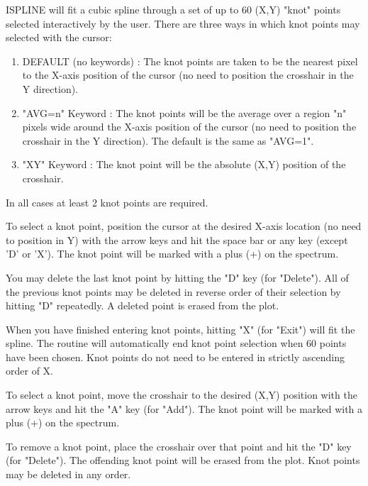 ISPLINE will fit a cubic spline through a set of up to 60 (X,Y) "knot"
points selected interactively by the user.  There are three ways in which
knot points may selected with the cursor:
\begin{enumerate} 
  \item{DEFAULT (no keywords) : The knot points are taken to be the nearest
       pixel to the X-axis position of the cursor (no need to position the
       crosshair in the Y direction).}

  \item{"AVG=n" Keyword : The knot points will be the average over a region
       "n" pixels wide around the X-axis position of the cursor (no need to
       position the crosshair in the Y direction).  The default is the same
       as "AVG=1".}

  \item{"XY" Keyword : The knot point will be the absolute (X,Y) position
       of the crosshair.}
\end{enumerate}
In all cases at least 2 knot points are required.

 
To select a knot point, position the cursor at the desired X-axis location
(no need to position in Y) with the arrow keys and hit the space bar or any
key (except 'D' or 'X').  The knot point will be marked with a plus (+) on
the spectrum.
 
You may delete the last knot point by hitting the "D" key (for "Delete").
All of the previous knot points may be deleted in reverse order of their
selection by hitting "D" repeatedly.  A deleted point is erased from the
plot.
 
When you have finished entering knot points, hitting "X" (for "Exit") will
fit the spline. The routine will automatically end knot point selection
when 60 points have been chosen.  Knot points do not need to be entered in
strictly ascending order of X.
 
 
To select a knot point, move the crosshair to the desired (X,Y) position
with the arrow keys and hit the "A" key (for "Add").  The knot point will
be marked with a plus (+) on the spectrum.
 
To remove a knot point, place the crosshair over that point and hit the "D"
key (for "Delete").  The offending knot point will be erased from the plot.
Knot points may be deleted in any order.
 
